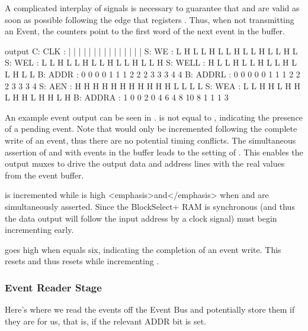 A complicated interplay of signals is necessary to guarantee that
 and  are valid
as soon as possible following the  edge that
registers . Thus, when not transmitting an Event,
the counters point to the first word of the next event in the buffer.



\begin{timing}{output}
C: CLK       :  | |  |  |  |  |  |  |  |  |  |  |  |  |  |  
S: WE        :  L H  L  L  H  L  L  H  L  L  H  L  L  H  L
S: WEL       :  L L  H  L  L  H  L  L  H  L  L  H  L  L  H
S: WELL      :  H L  L  H  L  L  H  L  L  H  L  L  H  L  L
B: ADDR      :  0 0  0  0  1  1  1  2  2  2  3  3  3  4  4
B: ADDRL     :  0 0  0  0  0  1  1  1  2  2  2  3  3  3  4 
S: AEN       :  H H  H  H  H  H  H  H  H  H  H  L  L  L  L 
S: WEA       :  L L  H  H  L  H  H  L  H  H  L  H  H  L  H
B: ADDRA     :  1 0  0  2  0  4  6  4  8  10 8  1  1  1  3
\end{timing}

An example event output can be seen in . 
is not equal to , indicating the presence of a
pending event. Note that  would only be
incremented following the complete write of an event, thus there are
no potential timing conflicts. The simultaneous assertion of
 and  with events in the
buffer leads to the setting of .  This enables
the output muxes to drive the output data and address lines with the
real values from the event buffer.

 is incremented while 
is high <emphasis>and</emphasis> when  and
 are simultaneously asserted. Since the
BlockSelect+ RAM is synchronous (and thus the data output will follow
the input address by a clock signal)  must
begin incrementing early.

 goes high when  equals
six, indicating the completion of an event write. This resets
 and thus resets 
while incrementing .  
    

\subsubsection{Event Reader Stage}

Here's where we read the events off the Event Bus and potentially
store them if they are for us, that is, if the relevant ADDR bit is
set.


